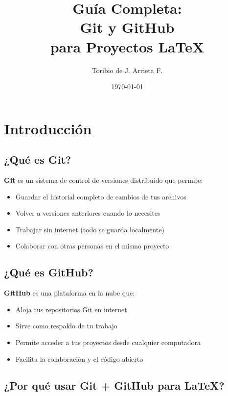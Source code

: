 \documentclass[11pt,a4paper]{article}
\title{\Huge\bfseries Guía Completa:\\Git y GitHub\\para Proyectos LaTeX}
\author{\Large Toribio de J. Arrieta F.}
\date{\today}
\begin{document}
\maketitle
\tableofcontents
\newpage

\section{Introducción}

\subsection{¿Qué es Git?}

\textbf{Git} es un sistema de control de versiones distribuido que permite:
\begin{itemize}
  \item Guardar el historial completo de cambios de tus archivos
  \item Volver a versiones anteriores cuando lo necesites
  \item Trabajar sin internet (todo se guarda localmente)
  \item Colaborar con otras personas en el mismo proyecto
\end{itemize}

\subsection{¿Qué es GitHub?}

\textbf{GitHub} es una plataforma en la nube que:
\begin{itemize}
  \item Aloja tus repositorios Git en internet
  \item Sirve como respaldo de tu trabajo
  \item Permite acceder a tus proyectos desde cualquier computadora
  \item Facilita la colaboración y el código abierto
\end{itemize}

\subsection{¿Por qué usar Git + GitHub para LaTeX?}
\end{document}
